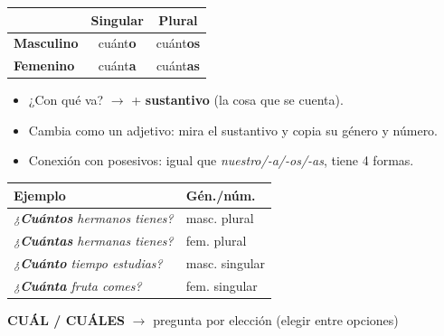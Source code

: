 \documentclass[a4paper,10pt]{article}
\begin{document}
\begin{minipage}[t]{0.45\linewidth}
\begin{center}
\begin{tabular}{|l|c|c|}
\hline
\rowcolor{naranjainterr!15}
 & \textbf{Singular} & \textbf{Plural} \\
\hline
\textbf{Masculino} & cuánt\textbf{o} & cuánt\textbf{os} \\
\hline
\rowcolor{grisclaro}
\textbf{Femenino} & cuánt\textbf{a} & cuánt\textbf{as} \\
\hline
\end{tabular}
\end{center}

\vspace{4pt}
\begin{itemize}[nosep, leftmargin=1em, font=\small]
\item ¿Con qué va? $\to$ + \textbf{sustantivo} (la cosa que se cuenta).
\item Cambia como un adjetivo: mira el sustantivo y copia su género y número.
\item Conexión con posesivos: igual que \textit{nuestro/-a/-os/-as}, tiene 4 formas.
\end{itemize}
\end{minipage}
\hfill
\begin{minipage}[t]{0.52\linewidth}
\begin{tabular}{|p{5cm}|l|}
\hline
\rowcolor{naranjainterr!10}
\textbf{Ejemplo} & \textbf{Gén./núm.} \\
\hline
\textit{¿\textbf{Cuántos} hermanos tienes?} & masc. plural \\
\hline
\rowcolor{grisclaro}
\textit{¿\textbf{Cuántas} hermanas tienes?} & fem. plural \\
\hline
\textit{¿\textbf{Cuánto} tiempo estudias?} & masc. singular \\
\hline
\rowcolor{grisclaro}
\textit{¿\textbf{Cuánta} fruta comes?} & fem. singular \\
\hline
\end{tabular}
\end{minipage}

\vspace{10pt}

\noindent\colorbox{naranjainterr!15}{\parbox{\dimexpr\linewidth-2\fboxsep}{\textbf{\large CUÁL / CUÁLES} $\to$ pregunta por elección (elegir entre opciones)}}

\vspace{4pt}
\end{document}
